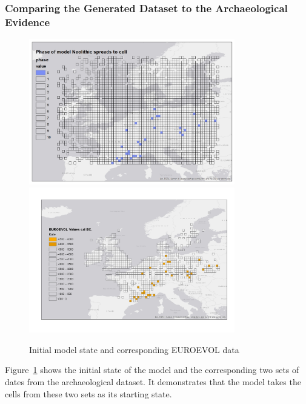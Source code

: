 \subsubsection{Comparing the Generated Dataset to the Archaeological Evidence}
\begin{figure}
\centering
	\includegraphics[width=0.8\textwidth]{figures/model-0}
	\includegraphics[width=0.8\textwidth]{figures/euroevol-0}
  \caption{Initial model state and corresponding EUROEVOL data}
  \label{fig:compare0}
\end{figure}

Figure~\ref{fig:compare0} shows the initial state of the model and the corresponding two sets of dates from the archaeological dataset. It demonstrates that the model takes the cells from these two sets as its starting state.

